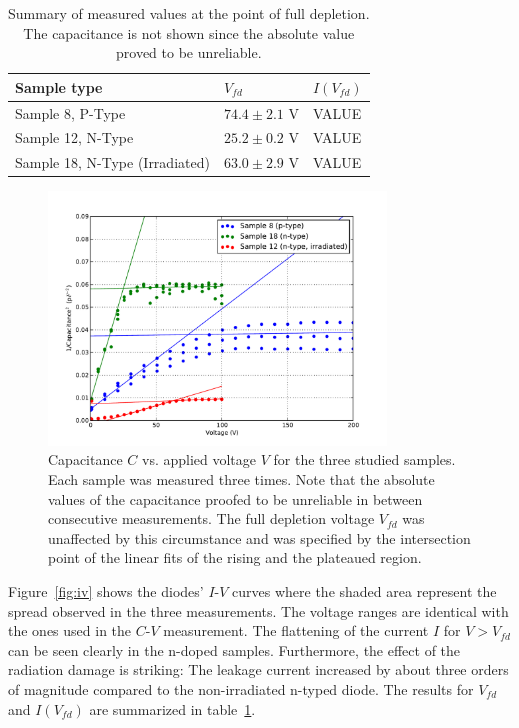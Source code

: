 \documentclass[11pt,a4paper]{report}
\begin{document}
\begin{table}
  \caption{Summary of measured values at the point of full depletion. The capacitance is not shown since the absolute value proved to be unreliable.}\label{tab:results}
  \centering
  \begin{tabular}{lll}
    \toprule
    Sample type         & $V_{fd}$ & $I(V_{fd})$ \\
    \midrule
    Sample 8, P-Type              & $74.4 \pm 2.1$ V   &    VALUE       \\
    Sample 12, N-Type              & $25.2 \pm 0.2$ V   &    VALUE       \\
    Sample 18, N-Type (Irradiated) & $63.0 \pm 2.9$ V   &    VALUE       \\
    \bottomrule
  \end{tabular}
\end{table}



\label{sec:results}
\begin{figure}
  \centering
  \includegraphics[width=0.8\textwidth]{./figures/cv.pdf}  
  \caption{Capacitance $C$ vs. applied voltage $V$ for the three studied samples. Each sample was measured three times. Note that the absolute values of the capacitance proofed to be unreliable in between consecutive measurements. The full depletion voltage $V_{fd}$ was unaffected by this circumstance and was specified by the intersection point of the linear fits of the rising and the plateaued region.}\label{fig:cv}
\end{figure}

Figure~\ref{fig:iv} shows the diodes' $I$-$V$ curves where the shaded area represent the spread observed in the three measurements.
The voltage ranges are identical with the ones used in the $C$-$V$ measurement.
The flattening of the current $I$ for $V>V_{fd}$ can be seen clearly in the n-doped samples.
Furthermore, the effect of the radiation damage is striking: The leakage current increased by about three orders of magnitude compared to the non-irradiated n-typed diode.
The results for $V_{fd}$ and $I(V_{fd})$  are summarized in table~\ref{tab:results}.
\end{document}
